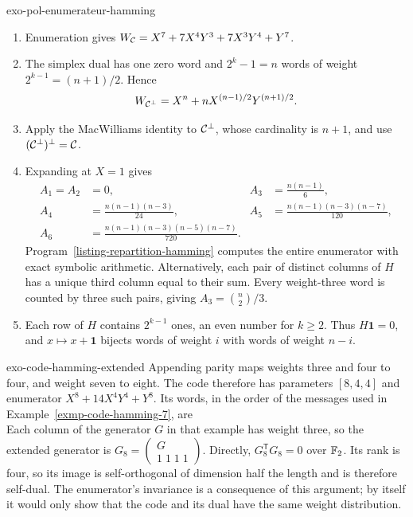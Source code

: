 \begin{correction}{exo-pol-enumerateur-hamming}
\begin{enumerate}
\item Enumeration gives $W_{\mathcal{C}}=X^7+7X^4Y^3+7X^3Y^4+Y^7$.
\item The simplex dual has one zero word and $2^k-1=n$ words of
weight $2^{k-1}=(n+1)/2$. Hence
\[
 W_{\mathcal{C}^\bot}=X^n+nX^{(n-1)/2}Y^{(n+1)/2}.
\]
\item Apply the MacWilliams identity to $\mathcal{C}^\bot$, whose cardinality
is $n+1$, and use $(\mathcal{C}^\bot)^\bot=\mathcal{C}$.
\item Expanding at $X=1$ gives
\[
 \begin{aligned}
 A_1=A_2&=0,& A_3&=\frac{n(n-1)}6,\\
 A_4&=\frac{n(n-1)(n-3)}{24},&
 A_5&=\frac{n(n-1)(n-3)(n-7)}{120},\\
 A_6&=\frac{n(n-1)(n-3)(n-5)(n-7)}{720}.
 \end{aligned}
\]
Program~\ref{listing-repartition-hamming} computes the entire enumerator
with exact symbolic arithmetic. Alternatively, each pair of distinct
columns of $H$ has a unique third column equal to their sum. Every
weight-three word is counted by three such pairs, giving
$A_3=\binom n2/3$.
\begin{listing}[H]

\caption{Exact weight distribution of a binary Hamming code.}
\label{listing-repartition-hamming}
\end{listing}
\item Each row of $H$ contains $2^{k-1}$ ones, an even number for
$k\geq2$. Thus $H\mathbf1=0$, and $x\mapsto x+\mathbf1$ bijects words
of weight $i$ with words of weight $n-i$.
\end{enumerate}
\end{correction}

\begin{correction}{exo-code-hamming-extended}
Appending parity maps weights three and four to four, and weight seven
to eight. The code therefore has parameters $[8,4,4]$ and enumerator
$X^8+14X^4Y^4+Y^8$. Its words, in the order of the messages used in
Example~\ref{exmp-code-hamming-7}, are
\[
 
\]
Each column of the generator $G$ in that example has weight three, so
the extended generator is $G_8=\begin{pmatrix}G\\1\;1\;1\;1\end{pmatrix}$.
Directly, $G_8^{\mathsf T}G_8=0$ over $\mathbb{F}_2$. Its rank is four, so its
image is self-orthogonal of dimension half the length and is therefore
self-dual. The enumerator's invariance is a consequence of this argument;
by itself it would only show that the code and its dual have the same
weight distribution.
\end{correction}

